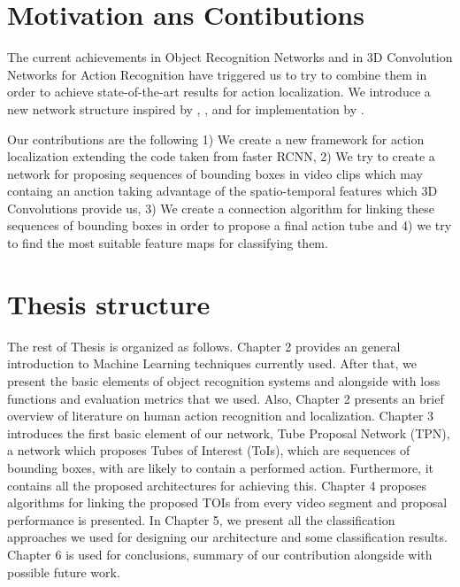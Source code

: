 \section{Motivation ans Contibutions}
The current achievements in Object Recognition Networks and in 3D Convolution Networks for Action Recognition have triggered us to try
to combine them in order to achieve state-of-the-art results for action localization. We introduce a new network structure inspired by
\cite{DBLP:journals/corr/HouCS17}, \cite{DBLP:journals/corr/abs-1712-09184},\cite{Ren:2015:FRT:2969239.2969250} and for implementation
by \cite{jjfaster2rcnn}.

Our contributions are the following 1) We create a new framework for action localization extending the code taken from faster RCNN,
2) We try to create a network for proposing sequences of bounding boxes in video clips which may containg an anction taking advantage
of the spatio-temporal features which 3D Convolutions provide us, 3) We create a connection algorithm for linking these sequences of
bounding boxes in order to propose a final action tube and 4) we try to find the most suitable feature maps for classifying them.

\section{Thesis structure}
The rest of Thesis is organized as follows. Chapter 2 provides an general introduction to Machine Learning techniques currently used.
After that, we present the basic elements of object recognition systems and alongside with loss functions and evaluation metrics that
we used. Also, Chapter 2 presents an brief overview of literature on human action recognition and localization. Chapter 3 introduces the first basic element of our network, Tube Proposal Network (TPN), a network which proposes Tubes of Interest (ToIs), which are sequences of bounding boxes, with are likely to contain a performed action. Furthermore, it contains all the proposed architectures for achieving this.
Chapter 4 proposes algorithms for linking the proposed TOIs from every video segment and proposal performance is presented.
In Chapter 5, we present all the classification approaches we used for designing our architecture and some classification results.
Chapter 6 is used for conclusions, summary of our contribution alongside with possible future work.

% 
